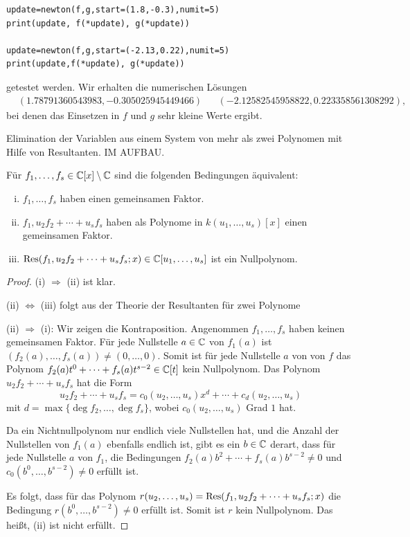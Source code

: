 \documentclass[11pt]{article}
\numberwithin{equation}{section}
\begin{document}
\begin{beispiel}
\begin{lstlisting}
update=newton(f,g,start=(1.8,-0.3),numit=5)
print(update, f(*update), g(*update))

update=newton(f,g,start=(-2.13,0.22),numit=5)
print(update,f(*update), g(*update))
\end{lstlisting} 
getestet werden. Wir erhalten die numerischen Lösungen
\begin{align*}
	& (1.78791360543983, -0.305025945449466)  & & 
	(-2.12582545958822, 0.223358561308292),
\end{align*} 
bei denen das Einsetzen in $f$ und $g$ sehr kleine Werte ergibt. 
\end{beispiel} 

\begin{remark}
	Elimination der Variablen aus einem System von mehr als zwei Polynomen mit Hilfe von Resultanten. IM AUFBAU. 
\end{remark}

\begin{theorem}
	Für $f_1,\ldots,f_s \in \mathbb{C}[x] \setminus \mathbb{C}$ sind die folgenden Bedingungen äquivalent:
	\begin{enumerate}[(i)]
		\item  $f_1,\ldots,f_s$ haben einen gemeinsamen Faktor. 
		\item $f_1, u_2 f_2 + \cdots + u_s f_s$ haben als Polynome in $k(u_1,\ldots,u_s)[x]$ einen gemeinsamen Faktor. 
		\item $\operatorname{Res}(f_1, u_2 f_2 + \cdots + u_s f_s; x)  \in \mathbb{C}[u_1,\ldots,u_s]$ ist ein Nullpolynom. 
	\end{enumerate}
\end{theorem}
\begin{proof} 
	(i) $\Rightarrow$ (ii) ist klar. 
	
	(ii) $\Leftrightarrow$ (iii) folgt aus der Theorie der Resultanten für zwei Polynome 
	
	(ii) $\Rightarrow$ (i): Wir zeigen die Kontraposition. Angenommen $f_1,\ldots,f_s$ haben keinen gemeinsamen Faktor. Für jede Nullstelle  $a \in \mathbb{C}$ von $f_1(a)$ ist $(f_2(a),\ldots,f_s(a)) \ne (0,\ldots, 0)$. Somit ist für jede Nullstelle $a$ von von $f$ das Polynom $f_2(a) t^0 + \cdots + f_s(a) t^{s-2} \in \mathbb{C}[t]$ kein Nullpolynom. Das Polynom $u_2 f_2 + \cdots + u_s f_s$ hat die Form 
	\[
		u_2 f_2 + \cdots + u_s f_s = c_0(u_2,\ldots,u_s) x^d + \cdots + c_d(u_2,\ldots,u_s)
	\]
	mit $d=\max \{\deg f_2,\ldots, \deg f_s\}$, wobei $c_0(u_2,\ldots,u_s)$ Grad $1$ hat.  
	
	
	Da ein Nichtnullpolynom nur endlich viele Nullstellen hat, und die Anzahl der Nullstellen von $f_1(a)$ ebenfalls endlich ist, gibt es ein $b \in \mathbb{C}$ derart, dass für jede Nullstelle $a$ von $f_1$, die Bedingungen $f_2(a) b^2 + \cdots + f_s(a) b^{s-2} \ne 0$ und $c_0(b^0,\ldots,b^{s-2}) \ne 0$ erfüllt ist. 
	
	Es folgt, dass für das Polynom $r(u_2,\ldots,u_s) = \operatorname{Res}(f_1, u_2 f_2 + \cdots + u_s f_s; x)$ die Bedingung $r(b^0,\ldots,b^{s-2}) \ne 0$ erfüllt ist. Somit ist $r$ kein Nullpolynom. Das heißt, (ii) ist nicht erfüllt. 
\end{proof} 
\end{document}
